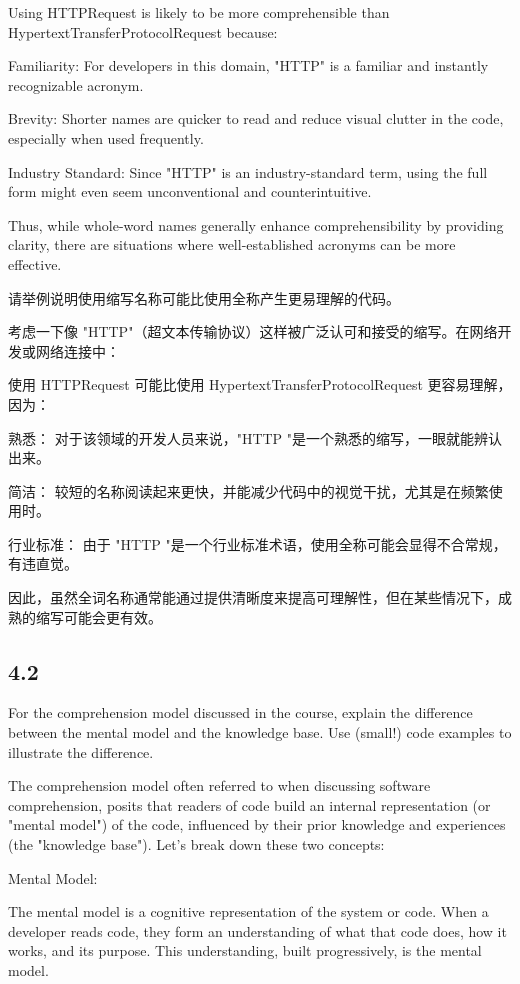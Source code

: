 \documentclass[]{ctexbook}
\begin{document}
Using HTTPRequest is likely to be more comprehensible than HypertextTransferProtocolRequest because:

Familiarity: For developers in this domain, "HTTP" is a familiar and instantly recognizable acronym.

Brevity: Shorter names are quicker to read and reduce visual clutter in the code, especially when used frequently.

Industry Standard: Since "HTTP" is an industry-standard term, using the full form might even seem unconventional and counterintuitive.

Thus, while whole-word names generally enhance comprehensibility by providing clarity, there are situations where well-established acronyms can be more effective.

请举例说明使用缩写名称可能比使用全称产生更易理解的代码。

考虑一下像 "HTTP"（超文本传输协议）这样被广泛认可和接受的缩写。在网络开发或网络连接中：

使用 HTTPRequest 可能比使用 HypertextTransferProtocolRequest 更容易理解，因为：

熟悉： 对于该领域的开发人员来说，"HTTP "是一个熟悉的缩写，一眼就能辨认出来。

简洁： 较短的名称阅读起来更快，并能减少代码中的视觉干扰，尤其是在频繁使用时。

行业标准： 由于 "HTTP "是一个行业标准术语，使用全称可能会显得不合常规，有违直觉。

因此，虽然全词名称通常能通过提供清晰度来提高可理解性，但在某些情况下，成熟的缩写可能会更有效。

\subsection{4.2}
For the comprehension model discussed in the course, explain the difference between the mental model and the knowledge base. Use (small!) code examples to illustrate the difference.

The comprehension model often referred to when discussing software comprehension, posits that readers of code build an internal representation (or "mental model") of the code, influenced by their prior knowledge and experiences (the "knowledge base"). Let's break down these two concepts:

Mental Model:

The mental model is a cognitive representation of the system or code. When a developer reads code, they form an understanding of what that code does, how it works, and its purpose. This understanding, built progressively, is the mental model.
\end{document}
